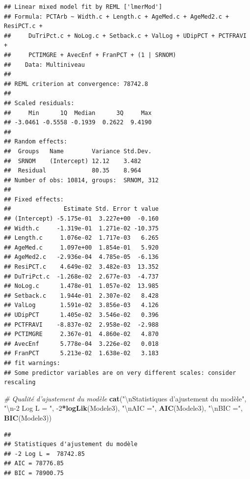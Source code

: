 \documentclass[
  11pt,
  french,
]{book}
\makeatletter
\newenvironment{Shaded}{\begin{snugshade}}{\end{snugshade}}
\newcommand{\CharTok}[1]{\textcolor[rgb]{0.31,0.60,0.02}{#1}}
\newcommand{\CommentTok}[1]{\textcolor[rgb]{0.56,0.35,0.01}{\textit{#1}}}
\newcommand{\DecValTok}[1]{\textcolor[rgb]{0.00,0.00,0.81}{#1}}
\newcommand{\KeywordTok}[1]{\textcolor[rgb]{0.13,0.29,0.53}{\textbf{#1}}}
\newcommand{\NormalTok}[1]{#1}
\newcommand{\OperatorTok}[1]{\textcolor[rgb]{0.81,0.36,0.00}{\textbf{#1}}}
\newcommand{\StringTok}[1]{\textcolor[rgb]{0.31,0.60,0.02}{#1}}
\newenvironment{kframe}{%
\medskip{}
\setlength{\fboxsep}{.8em}
 \def\at@end@of@kframe{}%
 \ifinner\ifhmode%
  \def\at@end@of@kframe{\end{minipage}}%
  \begin{minipage}{\columnwidth}%
 \fi\fi%
 \def\FrameCommand##1{\hskip\@totalleftmargin \hskip-\fboxsep
 \colorbox{shadecolor}{##1}\hskip-\fboxsep
     \hskip-\linewidth \hskip-\@totalleftmargin \hskip\columnwidth}%
 \MakeFramed {\advance\hsize-\width
   \@totalleftmargin\z@ \linewidth\hsize
   \@setminipage}}%
 {\par\unskip\endMakeFramed%
 \at@end@of@kframe}
\renewenvironment{Shaded}{\begin{kframe}}{\end{kframe}}
\makeatother
\begin{document}
\begin{verbatim}
## Linear mixed model fit by REML ['lmerMod']
## Formula: PCTArb ~ Width.c + Length.c + AgeMed.c + AgeMed2.c + ResiPCT.c +  
##     DuTriPct.c + NoLog.c + Setback.c + ValLog + UDipPCT + PCTFRAVI +  
##     PCTIMGRE + AvecEnf + FranPCT + (1 | SRNOM)
##    Data: Multiniveau
## 
## REML criterion at convergence: 78742.8
## 
## Scaled residuals: 
##     Min      1Q  Median      3Q     Max 
## -3.0461 -0.5558 -0.1939  0.2622  9.4190 
## 
## Random effects:
##  Groups   Name        Variance Std.Dev.
##  SRNOM    (Intercept) 12.12    3.482   
##  Residual             80.35    8.964   
## Number of obs: 10814, groups:  SRNOM, 312
## 
## Fixed effects:
##               Estimate Std. Error t value
## (Intercept) -5.175e-01  3.227e+00  -0.160
## Width.c     -1.319e-01  1.271e-02 -10.375
## Length.c     1.076e-02  1.717e-03   6.265
## AgeMed.c     1.097e+00  1.854e-01   5.920
## AgeMed2.c   -2.936e-04  4.785e-05  -6.136
## ResiPCT.c    4.649e-02  3.482e-03  13.352
## DuTriPct.c  -1.268e-02  2.677e-03  -4.737
## NoLog.c      1.478e-01  1.057e-02  13.985
## Setback.c    1.944e-01  2.307e-02   8.428
## ValLog       1.591e-02  3.856e-03   4.126
## UDipPCT      1.405e-02  3.546e-02   0.396
## PCTFRAVI    -8.837e-02  2.958e-02  -2.988
## PCTIMGRE     2.367e-01  4.860e-02   4.870
## AvecEnf      5.778e-04  3.226e-02   0.018
## FranPCT      5.213e-02  1.638e-02   3.183
## fit warnings:
## Some predictor variables are on very different scales: consider rescaling
\end{verbatim}

\begin{Shaded}
\begin{Highlighting}[]
\CommentTok{# Qualité d'ajustement du modèle}
\KeywordTok{cat}\NormalTok{(}\StringTok{"}\CharTok{\textbackslash{}n}\StringTok{Statistiques d'ajustement du modèle"}\NormalTok{,}
    \StringTok{"}\CharTok{\textbackslash{}n}\StringTok{-2 Log L = "}\NormalTok{, }\DecValTok{-2}\OperatorTok{*}\KeywordTok{logLik}\NormalTok{(Modele3),}
    \StringTok{"}\CharTok{\textbackslash{}n}\StringTok{AIC ="}\NormalTok{, }\KeywordTok{AIC}\NormalTok{(Modele3), }\StringTok{"}\CharTok{\textbackslash{}n}\StringTok{BIC ="}\NormalTok{, }\KeywordTok{BIC}\NormalTok{(Modele3))}
\end{Highlighting}
\end{Shaded}

\begin{verbatim}
## 
## Statistiques d'ajustement du modèle 
## -2 Log L =  78742.85 
## AIC = 78776.85 
## BIC = 78900.75
\end{verbatim}
\end{document}
